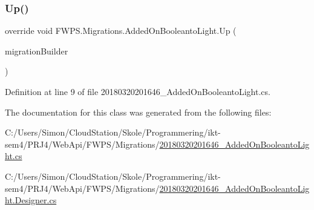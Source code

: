 \subsubsection{\texorpdfstring{Up()}{Up()}}
{\footnotesize\ttfamily override void F\+W\+P\+S.\+Migrations.\+Added\+On\+Booleanto\+Light.\+Up (\begin{DoxyParamCaption}\item[{Migration\+Builder}]{migration\+Builder }\end{DoxyParamCaption})\hspace{0.3cm}{\ttfamily [protected]}}



Definition at line 9 of file 20180320201646\+\_\+\+Added\+On\+Booleanto\+Light.\+cs.



The documentation for this class was generated from the following files\+:\begin{DoxyCompactItemize}
\item 
C\+:/\+Users/\+Simon/\+Cloud\+Station/\+Skole/\+Programmering/ikt-\/sem4/\+P\+R\+J4/\+Web\+Api/\+F\+W\+P\+S/\+Migrations/\mbox{\hyperlink{20180320201646___added_on_booleanto_light_8cs}{20180320201646\+\_\+\+Added\+On\+Booleanto\+Light.\+cs}}\item 
C\+:/\+Users/\+Simon/\+Cloud\+Station/\+Skole/\+Programmering/ikt-\/sem4/\+P\+R\+J4/\+Web\+Api/\+F\+W\+P\+S/\+Migrations/\mbox{\hyperlink{20180320201646___added_on_booleanto_light_8_designer_8cs}{20180320201646\+\_\+\+Added\+On\+Booleanto\+Light.\+Designer.\+cs}}\end{DoxyCompactItemize}
